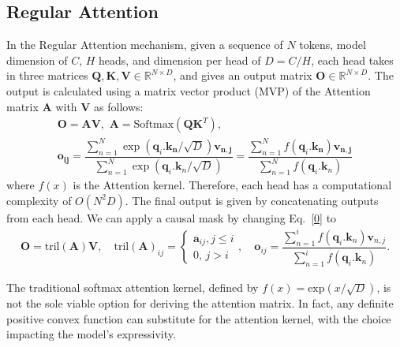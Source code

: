 \subsection{Regular Attention}
In the Regular Attention mechanism, given a sequence of $N$ tokens, model dimension of $C$, $H$ heads, and dimension per head of $D = C/H$, each head takes in three matrices $\mathbf{Q},\mathbf{K},\mathbf{V} \in \mathbb{R}^{N\times D}$, and gives an output matrix $\mathbf{O} \in \mathbb{R}^{N\times D}$. The output is calculated using a matrix vector product (MVP) of the Attention matrix $\mathbf{A}$ with $\mathbf{V}$ as follows:
\begin{gather}
  \mathbf{O} = \mathbf{A}\mathbf{V},\,\, \mathbf{A} = \mbox{Softmax}\left(\mathbf{Q}\mathbf{K}^T\right),\\
        \mathbf{o_{ij}} \!=\! \dfrac{\sum_{n=1}^{N}{\exp(\mathbf{q}_i.\mathbf{k_n}/\sqrt{D})\mathbf{v_{n,j}}}}{\sum_{n=1}^{N}{\exp(\mathbf{q}_i.\mathbf{k}_n/\sqrt{D})}} \!=\! \dfrac{\sum_{n=1}^{N}{f(\mathbf{q}_i.\mathbf{k_n})\mathbf{v_{n,j}}}}{\sum_{n=1}^{N}{f(\mathbf{q}_i.\mathbf{k}_n)}}\label{0}
\end{gather}
 where $f(x)$ is the Attention kernel. Therefore, each head has a computational complexity of $O(N^2D)$. The final output is given by concatenating outputs from each head. We can apply a causal mask by changing Eq.~\ref{0} to
 \begin{gather}
    \mathbf{O} = \mbox{tril}(\mathbf{A}) \mathbf{V}, \quad \mbox{tril}(\mathbf{A})_{ij} = \begin{cases}\mathbf{a}_{ij}, j\leq i\\0,\, j > i\end{cases},\quad
    \mathbf{o}_{ij} = \dfrac{\sum_{n=1}^{i}{f(\mathbf{q}_i.\mathbf{k}_n)\mathbf{v}_{n,j}}}{\sum_{n=1}^{i}{f(\mathbf{q}_i.\mathbf{k}_n)}}.
\end{gather}

\par The traditional softmax attention kernel, defined by $f(x)=\mbox{exp}(x/\sqrt{D})$, is not the sole viable option for deriving the attention matrix. In fact, any definite positive convex function can substitute for the attention kernel, with the choice impacting the model's expressivity.


